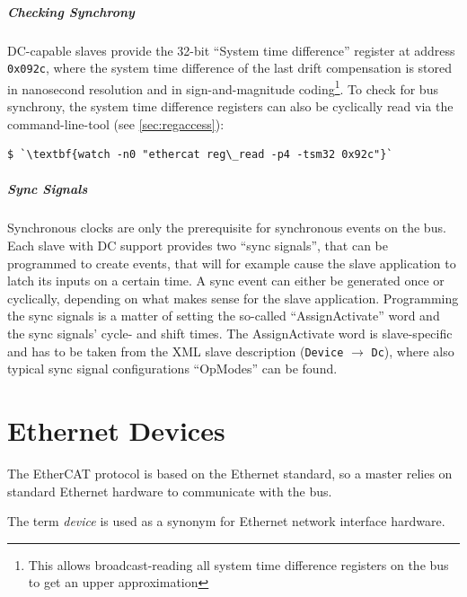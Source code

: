\documentclass[a4paper,12pt,BCOR6mm,bibtotoc,idxtotoc]{scrbook}
\begin{document}
\paragraph{Checking Synchrony} DC-capable slaves provide the 32-bit ``System
time difference'' register at address \lstinline+0x092c+, where the system
time difference of the last drift compensation is stored in nanosecond
resolution and in sign-and-magnitude coding\footnote{This allows
broadcast-reading all system time difference registers on the bus to get an
upper approximation}. To check for bus synchrony, the system time difference
registers can also be cyclically read via the command-line-tool (see
\autoref{sec:regaccess}):

\begin{lstlisting}
$ `\textbf{watch -n0 "ethercat reg\_read -p4 -tsm32 0x92c"}`
\end{lstlisting}

\paragraph{Sync Signals} Synchronous clocks are only the prerequisite for
synchronous events on the bus. Each slave with DC support provides two ``sync
signals'', that can be programmed to create events, that will for example
cause the slave application to latch its inputs on a certain time. A sync
event can either be generated once or cyclically, depending on what makes
sense for the slave application. Programming the sync signals is a matter of
setting the so-called ``AssignActivate'' word and the sync signals' cycle- and
shift times. The AssignActivate word is slave-specific and has to be taken
from the XML slave description (\lstinline+Device+ $\rightarrow$
\lstinline+Dc+), where also typical sync signal configurations ``OpModes'' can
be found.


\chapter{Ethernet Devices}
\label{sec:devices}

The EtherCAT protocol is based on the Ethernet standard, so a master relies on
standard Ethernet hardware to communicate with the bus.

The term \textit{device} is used as a synonym for Ethernet network interface
hardware.
\end{document}
